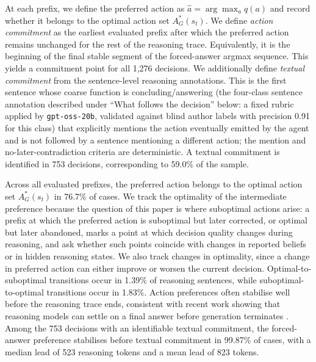 \documentclass{article}
\begin{document}
At each prefix, we define the preferred action as $\hat a=\arg\max_a q(a)$ and record whether it belongs to the optimal action set $A_G^*(s_t)$. 
We define \emph{action commitment} as the earliest evaluated prefix after which the preferred action remains unchanged for the rest of the reasoning trace.
Equivalently, it is the beginning of the final stable segment of the forced-answer argmax sequence. 
This yields a commitment point for all
1,276 decisions. 
We additionally define \emph{textual commitment} from the sentence-level reasoning annotations. 
This is the first sentence whose coarse function is concluding/answering (the four-class sentence annotation described under ``What follows the decision'' below: a fixed rubric applied by \texttt{gpt-oss-20b}, validated against blind author labels with precision 0.91 for this class) that explicitly mentions the action eventually emitted by the agent and is not followed by a sentence mentioning a different action; the mention and no-later-contradiction criteria are deterministic. 
A textual commitment is identified in 753 decisions, corresponding to 59.0\% of the sample.

Across all evaluated prefixes, the preferred action belongs to the optimal action set $A_G^*(s_t)$ in 76.7\% of cases. 
We track the optimality of the intermediate preference because the question of this paper is where suboptimal actions arise: a prefix at which the preferred action is suboptimal but later corrected, or optimal but later abandoned, marks a point at which decision quality changes during reasoning, and  ask whether such points coincide with changes in reported beliefs or in hidden reasoning states.
We also track changes in optimality, since a change in preferred action can either improve or worsen the current decision. Optimal-to-suboptimal transitions occur in 1.39\% of reasoning sentences, while suboptimal-to-optimal transitions occur in 1.83\%.
Action preferences often stabilise well before the reasoning trace ends,
consistent with recent work showing that reasoning models can settle on a final answer before generation terminates \cite{boppana2026reasoning,scalena2026beyond}. Among the 753 decisions with an identifiable textual commitment, the forced-answer preference stabilises before textual commitment in 99.87\% of cases, with a median lead of 523 reasoning tokens and a mean lead of 823 tokens.
\end{document}
